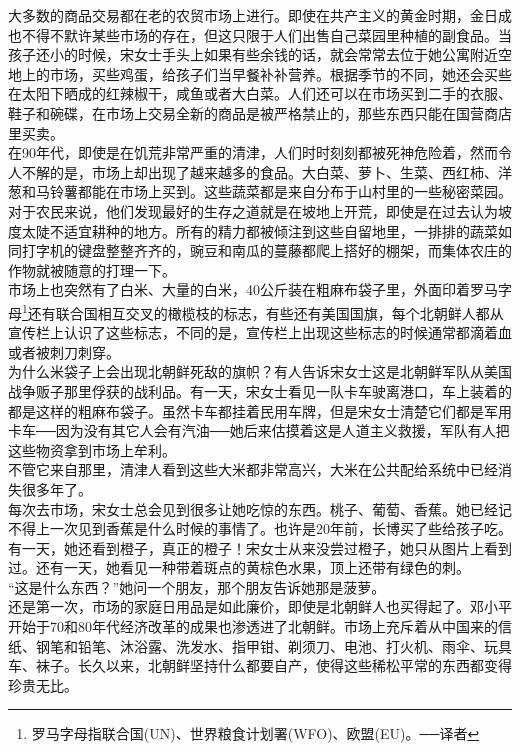 \begin{multicols}{\theparacolNo}
大多数的商品交易都在老的农贸市场上进行。即使在共产主义的黄金时期，金日成也不得不默许某些市场的存在，但这只限于人们出售自己菜园里种植的副食品。当孩子还小的时候，宋女士手头上如果有些余钱的话，就会常常去位于她公寓附近空地上的市场，买些鸡蛋，给孩子们当早餐补补营养。根据季节的不同，她还会买些在太阳下晒成的红辣椒干，咸鱼或者大白菜。人们还可以在市场买到二手的衣服、鞋子和碗碟，在市场上交易全新的商品是被严格禁止的，那些东西只能在国营商店里买卖。\\

在90年代，即使是在饥荒非常严重的清津，人们时时刻刻都被死神危险着，然而令人不解的是，市场上却出现了越来越多的食品。大白菜、萝卜、生菜、西红柿、洋葱和马铃薯都能在市场上买到。这些蔬菜都是来自分布于山村里的一些秘密菜园。对于农民来说，他们发现最好的生存之道就是在坡地上开荒，即使是在过去认为坡度太陡不适宜耕种的地方。所有的精力都被倾注到这些自留地里，一排排的蔬菜如同打字机的键盘整整齐齐的，豌豆和南瓜的蔓藤都爬上搭好的棚架，而集体农庄的作物就被随意的打理一下。\\

市场上也突然有了白米、大量的白米，40公斤装在粗麻布袋子里，外面印着罗马字母\footnote{罗马字母指联合国(UN)、世界粮食计划署(WFO)、欧盟(EU)。──译者}还有联合国相互交叉的橄榄枝的标志，有些还有美国国旗，每个北朝鲜人都从宣传栏上认识了这些标志，不同的是，宣传栏上出现这些标志的时候通常都滴着血或者被刺刀刺穿。\\

为什么米袋子上会出现北朝鲜死敌的旗帜？有人告诉宋女士这是北朝鲜军队从美国战争贩子那里俘获的战利品。有一天，宋女士看见一队卡车驶离港口，车上装着的都是这样的粗麻布袋子。虽然卡车都挂着民用车牌，但是宋女士清楚它们都是军用卡车──因为没有其它人会有汽油──她后来估摸着这是人道主义救援，军队有人把这些物资拿到市场上牟利。\\

不管它来自那里，清津人看到这些大米都非常高兴，大米在公共配给系统中已经消失很多年了。\\

每次去市场，宋女士总会见到很多让她吃惊的东西。桃子、葡萄、香蕉。她已经记不得上一次见到香蕉是什么时候的事情了。也许是20年前，长博买了些给孩子吃。有一天，她还看到橙子，真正的橙子！宋女士从来没尝过橙子，她只从图片上看到过。还有一天，她看见一种带着斑点的黄棕色水果，顶上还带有绿色的刺。\\

“这是什么东西？”她问一个朋友，那个朋友告诉她那是菠萝。\\

还是第一次，市场的家庭日用品是如此廉价，即使是北朝鲜人也买得起了。邓小平开始于70和80年代经济改革的成果也渗透进了北朝鲜。市场上充斥着从中国来的信纸、钢笔和铅笔、沐浴露、洗发水、指甲钳、剃须刀、电池、打火机、雨伞、玩具车、袜子。长久以来，北朝鲜坚持什么都要自产，使得这些稀松平常的东西都变得珍贵无比。\\


\end{multicols}
